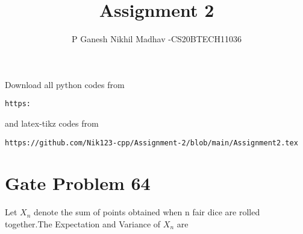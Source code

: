 \documentclass[journal,12pt,twocolumn]{IEEEtran}
\begin{document}
     \def\rightbox#1{\makebox[0in][r]{#1}}
     \def\centbox#1{\makebox[0in]{#1}}
     \def\topbox#1{\raisebox{-\baselineskip}[0in][0in]{#1}}
     \def\midbox#1{\raisebox{-0.5\baselineskip}[0in][0in]{#1}}
\vspace{3cm}
\title{Assignment 2}
\author{P Ganesh Nikhil Madhav -CS20BTECH11036}
\maketitle
\newpage
\bigskip
\renewcommand{\thefigure}{\theenumi}
\renewcommand{\thetable}{\theenumi}
Download all python codes from 
\begin{lstlisting}
https:
\end{lstlisting}
%
and latex-tikz codes from 
%
\begin{lstlisting}
https://github.com/Nik123-cpp/Assignment-2/blob/main/Assignment2.tex
\end{lstlisting}
\section{Gate Problem 64}
Let $X_{n}$ denote the sum of points obtained when n fair dice are rolled together.The Expectation and Variance of $X_{n}$ are
\end{document}
